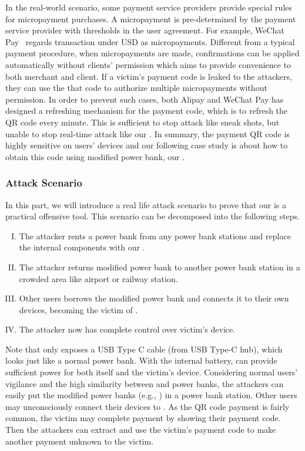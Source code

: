 In the real-world scenario, some payment service providers provide special rules for micropayment purchases.
A micropayment is pre-determined by the payment service provider with thresholds in the user agreement.
For example, WeChat Pay~\cite{Wechat-pay} regards transaction under USD  as micropayments.
Different from a typical payment procedure, when micropayments are made, confirmations can be applied automatically without clients' permission which aims to provide convenience to both merchant and client.
If a victim's payment code is leaked to the attackers, they can use the that code to authorize multiple micropayments without permission.
In order to prevent such cases, both Alipay and WeChat Pay has designed a refreshing mechanism for the payment code, which is to refresh the QR code every minute. This is sufficient to stop attack like sneak shots, but unable to stop real-time attack like our \tool.
In summary, the payment QR code is highly sensitive on users' devices and our following case study is about how to obtain this code using modified power bank, our \tool.

\subsubsection{Attack Scenario}
In this part, we will introduce a real life attack scenario to prove that our \tool is a practical offensive tool.
This scenario can be decomposed into the following steps.
\begin{enumerate}[I. ]
	\item The attacker rents a power bank from any power bank stations and replace the internal components with our \tool.
	\item The attacker returns modified power bank to another power bank station in a crowded area like airport or railway station.
	\item Other users borrows the modified power bank and connects it to their own devices, becoming the victim of \tool.
	\item The attacker now has complete control over victim's device.
\end{enumerate}

Note that \tool only exposes a USB Type C cable (from USB Type-C hub), which looks just like a normal power bank. With the internal battery, \tool can provide sufficient power for both itself and the victim's device.
Considering normal users' vigilance and the high similarity between \tool and power banks, the attackers can easily put the modified power banks (e.g., \tool) in a power bank station.
Other users may unconsciously connect their devices to \tool.
As the QR code payment is fairly common, the victim may complete payment by showing their payment code.
Then the attackers can extract and use the victim's payment code to make another payment unknown to the victim.

